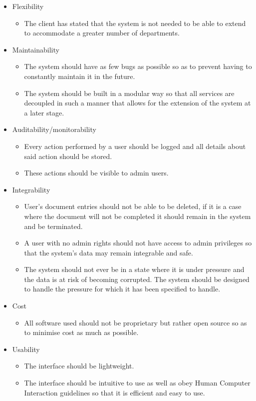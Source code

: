 \documentclass{article}
\begin{document}
\begin{itemize}
\begin{itemize}
			\end{itemize}
			\item Flexibility
			\begin{itemize}
				\item The client has stated that the system is not needed to be able to extend to accommodate a greater number of departments.
			\end{itemize}
			\item Maintainability
			\begin{itemize}
				\item The system should have as few bugs as possible so as to prevent having to constantly maintain it in the future.
				\item The system should be built in a modular way so that all services are decoupled in such a manner that allows for the extension of the system at a later stage.
			\end{itemize}
			\item Auditability/monitorability
			\begin{itemize}
				\item Every action performed by a user should be logged and all details about said action should be stored.
				\item These actions should be visible to admin users.
			\end{itemize}
			\item Integrability
			\begin{itemize}
				\item User's document entries should not be able to be deleted, if it is a case where the document will not be completed it should remain in the system and be terminated.
				\item A user with no admin rights should not have access to admin privileges so that the system's data may remain integrable and safe.
				\item The system should not ever be in a state where it is under pressure and the data is at risk of becoming corrupted. The system should be designed to handle the pressure for which it has been specified to handle.
			\end{itemize}
			\item Cost
			\begin{itemize}
				\item All software used should not be proprietary but rather open source so as to minimise cost as much as possible.
			\end{itemize}
			\item Usability
			\begin{itemize}
				\item The interface should be lightweight.
				\item The interface should be intuitive to use as well as obey Human Computer Interaction guidelines so that it is efficient and easy to use.
			\end{itemize}
		\end{itemize}
\end{document}
